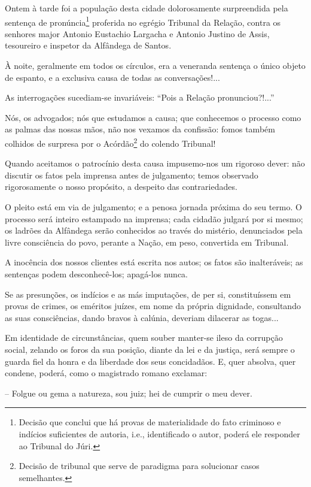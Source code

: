 Ontem à tarde foi a população desta cidade dolorosamente surpreendida
pela sentença de pronúncia\footnote{Decisão que conclui que há provas de
  materialidade do fato criminoso e indícios suficientes de autoria,
  i.e., identificado o autor, poderá ele responder ao Tribunal do Júri.}
proferida no egrégio Tribunal da Relação, contra os senhores major
Antonio Eustachio Largacha e Antonio Justino de Assis, tesoureiro e
inspetor da Alfândega de Santos.

À noite, geralmente em todos os círculos, era a veneranda sentença o
único objeto de espanto, e a exclusiva causa de todas as
conversações!...

As interrogações sucediam-se invariáveis: ``Pois a Relação
pronunciou?!...''

Nós, os advogados; nós que estudamos a causa; que conhecemos o processo
como as palmas das nossas mãos, não nos vexamos da confissão: fomos
também colhidos de surpresa por o Acórdão\footnote{Decisão de tribunal
  que serve de paradigma para solucionar casos semelhantes.} do colendo
Tribunal!

Quando aceitamos o patrocínio desta causa impusemo-nos um rigoroso
dever: não discutir os fatos pela imprensa antes de julgamento; temos
observado rigorosamente o nosso propósito, a despeito das
contrariedades.

O pleito está em via de julgamento; e a penosa jornada próxima do seu
termo. O processo será inteiro estampado na imprensa; cada cidadão
julgará por si mesmo; os ladrões da Alfândega serão conhecidos ao través
do mistério, denunciados pela livre consciência do povo, perante a
Nação, em peso, convertida em Tribunal.

A inocência dos nossos clientes está escrita nos autos; os fatos são
inalteráveis; as sentenças podem desconhecê-los; apagá-los nunca.

Se as presunções, os indícios e as más imputações, de per si,
constituíssem em provas de crimes, os eméritos juízes, em nome da
própria dignidade, consultando as suas consciências, dando bravos à
calúnia, deveriam dilacerar as togas...

Em identidade de circunstâncias, quem souber manter-se ileso da
corrupção social, zelando os foros da sua posição, diante da lei e da
justiça, será sempre o guarda fiel da honra e da liberdade dos seus
concidadãos. E, quer absolva, quer condene, poderá, como o magistrado
romano exclamar:

-- Folgue ou gema a natureza, sou juiz; hei de cumprir o meu dever.

